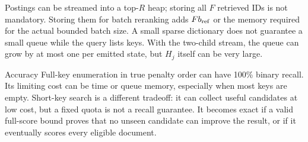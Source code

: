 Postings can be streamed into a top-$R$ heap; storing all $F$ retrieved IDs is not mandatory.
Storing them for batch reranking adds $F b_{\rm ref}$ or the memory required for the actual bounded batch
size. A small sparse dictionary does not guarantee a small queue while the query lists keys. With the two-child stream, the queue can grow by at most one per emitted state, but
$H_j$ itself can be very large.

\begin{resultbox}{Accuracy}
Full-key enumeration in true penalty order can have 100\% binary recall. Its limiting cost can
be time or queue memory, especially when most keys are empty. Short-key search is a different
tradeoff: it can collect useful candidates at low cost, but a fixed quota is not a recall guarantee.
It becomes exact if a valid full-score bound proves that no unseen candidate can improve the
result, or if it eventually scores every eligible document.
\end{resultbox}
